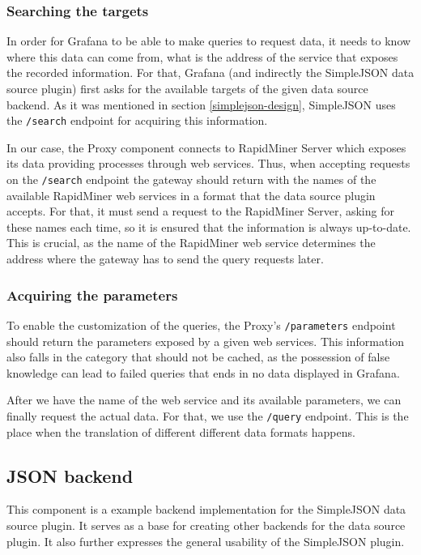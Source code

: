 \subsubsection{Searching the targets}

In order for Grafana to be able to make queries to request data, it needs to know where this data can come from, what is the address of the service that exposes the recorded information. For that, Grafana (and indirectly the SimpleJSON data source plugin) first asks for the available targets of the given data source backend. As it was mentioned in section \ref{simplejson-design}, SimpleJSON uses the \texttt{/search} endpoint for acquiring this information.

In our case, the Proxy component connects to RapidMiner Server which exposes its data providing processes through web services. Thus, when accepting requests on the \texttt{/search} endpoint the gateway should return with the names of the available RapidMiner web services in a format that the data source plugin accepts. For that, it must send a request to the RapidMiner Server, asking for these names each time, so it is ensured that the information is always up-to-date. This is crucial, as the name of the RapidMiner web service determines the address where the gateway has to send the query requests later.

\subsubsection{Acquiring the parameters}

To enable the customization of the queries, the Proxy's \texttt{/parameters} endpoint should return the parameters exposed by a given web services. This information also falls in the category that should not be cached, as the possession of false knowledge can lead to failed queries that ends in no data displayed in Grafana.

After we have the name of the web service and its available parameters, we can finally request the actual data. For that, we use the \texttt{/query} endpoint. This is the place when the translation of different different data formats happens.

\subsection{JSON backend}
This component is a example backend implementation for the SimpleJSON data source plugin. It serves as a base for creating other backends for the data source plugin. It also further expresses the general usability of the SimpleJSON plugin.

